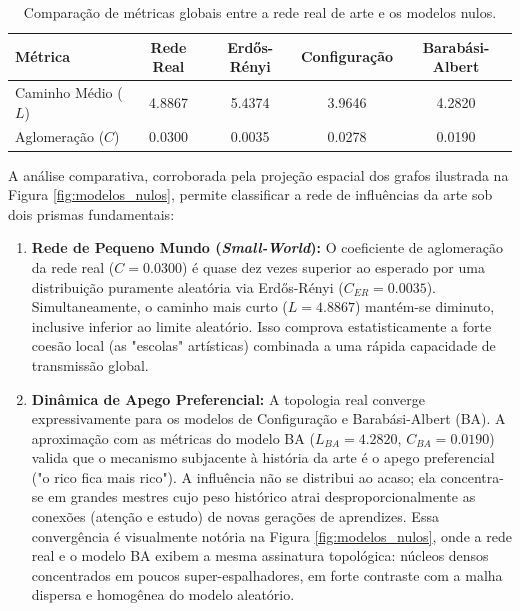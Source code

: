\documentclass[12pt,a4paper]{article}
\begin{document}
\begin{table}[htpb]
    \centering
    \caption{Comparação de métricas globais entre a rede real de arte e os modelos nulos.}
    \label{tab:modelos_nulos}
    \begin{tabular}{@{}lcccc@{}}
        \toprule
        \textbf{Métrica}    & \textbf{Rede Real} & \textbf{Erdős-Rényi} & \textbf{Configuração} & \textbf{Barabási-Albert} \\ \midrule
        Caminho Médio ($L$) & 4.8867             & 5.4374               & 3.9646                & 4.2820                   \\
        Aglomeração ($C$)   & 0.0300             & 0.0035               & 0.0278                & 0.0190                   \\ \bottomrule
    \end{tabular}
\end{table}

A análise comparativa, corroborada pela projeção espacial dos grafos ilustrada na Figura \ref{fig:modelos_nulos}, permite classificar a rede de influências da arte sob dois prismas fundamentais:

\begin{enumerate}
    \item \textbf{Rede de Pequeno Mundo (\textit{Small-World}):} O coeficiente de aglomeração da rede real ($C = 0.0300$) é quase dez vezes superior ao esperado por uma distribuição puramente aleatória via Erdős-Rényi ($C_{ER} = 0.0035$). Simultaneamente, o caminho mais curto ($L = 4.8867$) mantém-se diminuto, inclusive inferior ao limite aleatório. Isso comprova estatisticamente a forte coesão local (as "escolas" artísticas) combinada a uma rápida capacidade de transmissão global.

    \item \textbf{Dinâmica de Apego Preferencial:} A topologia real converge expressivamente para os modelos de Configuração e Barabási-Albert (BA). A aproximação com as métricas do modelo BA ($L_{BA} = 4.2820$, $C_{BA} = 0.0190$) valida que o mecanismo subjacente à história da arte é o apego preferencial ("o rico fica mais rico"). A influência não se distribui ao acaso; ela concentra-se em grandes mestres cujo peso histórico atrai desproporcionalmente as conexões (atenção e estudo) de novas gerações de aprendizes. Essa convergência é visualmente notória na Figura \ref{fig:modelos_nulos}, onde a rede real e o modelo BA exibem a mesma assinatura topológica: núcleos densos concentrados em poucos super-espalhadores, em forte contraste com a malha dispersa e homogênea do modelo aleatório.
\end{enumerate}
\end{document}
